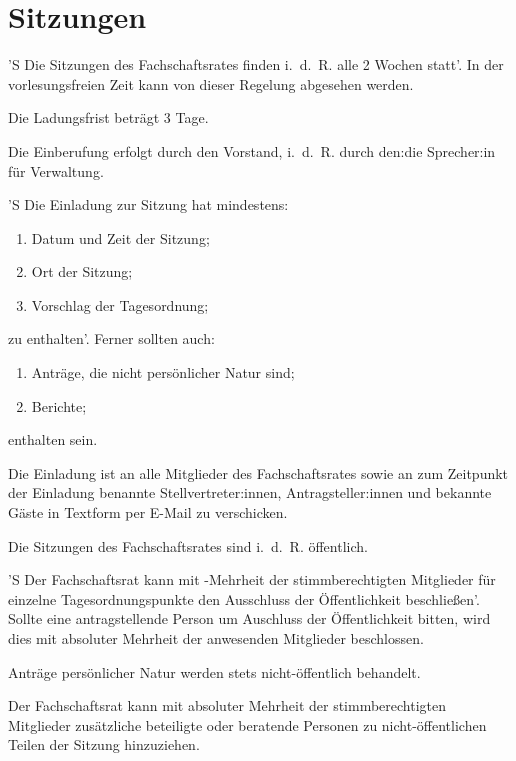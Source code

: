 \documentclass[%
    parskip=half,
]{scrartcl}
\newcounter{enumitem}
\begin{document}
\section{Sitzungen}

\begin{contract}

\label{ladung}

'S Die Sitzungen des Fachschaftsrates finden i.~d.~R. alle 2 Wochen statt'.
In der vorlesungsfreien Zeit kann von dieser Regelung abgesehen werden.

Die Ladungsfrist beträgt 3 Tage.\label{ladungsfrist}

Die Einberufung erfolgt durch den Vorstand, i.~d.~R. durch den:die Sprecher:in für Verwaltung.

'S Die Einladung zur Sitzung hat mindestens:
\begin{enumerate}[\qquad a)]
    \item Datum und Zeit der Sitzung;
    \item Ort der Sitzung;
    \item Vorschlag der Tagesordnung;
    \setcounter{enumitem}{\value{enumi}}
\end{enumerate}
zu enthalten'.
Ferner sollten auch:
\begin{enumerate}[\qquad a)]
    \setcounter{enumi}{\value{enumitem}}
    \item Anträge, die nicht persönlicher Natur sind;
    \item Berichte;
\end{enumerate}
enthalten sein.

Die Einladung ist an alle Mitglieder des Fachschaftsrates sowie an zum Zeitpunkt der Einladung benannte Stellvertreter:innen, Antragsteller:innen und bekannte Gäste in Textform per E-Mail zu verschicken.


Die Sitzungen des Fachschaftsrates sind i.~d.~R. öffentlich.

'S Der Fachschaftsrat kann mit -Mehrheit der stimmberechtigten Mitglieder für einzelne Tagesordnungspunkte den Ausschluss der Öffentlichkeit beschließen'.
Sollte eine antragstellende Person um Auschluss der Öffentlichkeit bitten, wird dies mit absoluter Mehrheit der anwesenden Mitglieder beschlossen.

Anträge persönlicher Natur werden stets nicht-öffentlich behandelt.

Der Fachschaftsrat kann mit absoluter Mehrheit der stimmberechtigten Mitglieder zusätzliche beteiligte oder beratende Personen zu nicht-öffentlichen Teilen der Sitzung hinzuziehen.


\end{contract}
\end{document}
